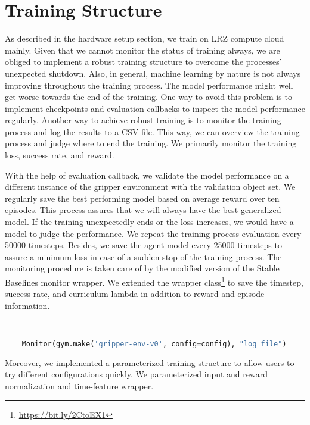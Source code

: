 \section{Training Structure}

As described in the hardware setup section, we train on LRZ compute cloud mainly. Given that we cannot monitor the status of training always, we are obliged to implement a robust training structure to overcome the processes' unexpected shutdown. Also, in general, machine learning by nature is not always improving throughout the training process. The model performance might well get worse towards the end of the training. One way to avoid this problem is to implement checkpoints and evaluation callbacks to inspect the model performance regularly. Another way to achieve robust training is to monitor the training process and log the results to a CSV file. This way, we can overview the training process and judge where to end the training. We primarily monitor the training loss, success rate, and reward.

With the help of evaluation callback, we validate the model performance on a different instance of the gripper environment with the validation object set. We regularly save the best performing model based on average reward over ten episodes. This process assures that we will always have the best-generalized model. If the training unexpectedly ends or the loss increases, we would have a model to judge the performance. We repeat the training process evaluation every 50000 timesteps. Besides, we save the agent model every 25000 timesteps to assure a minimum loss in case of a sudden stop of the training process.
The monitoring procedure is taken care of by the modified version of the Stable Baselines monitor wrapper.  We extended the wrapper class\footnote{\url{https://bit.ly/2CtoEX1}} to save the timestep, success rate, and curriculum lambda in addition to reward and episode information.


\begin{lstlisting}[language=Python, caption= Integration of monitor wrapper helper function, label=code:monitor]


    Monitor(gym.make('gripper-env-v0', config=config), "log_file")


\end{lstlisting}

Moreover, we implemented a parameterized training structure to allow users to try different configurations quickly. We parameterized input and reward normalization and time-feature wrapper.

